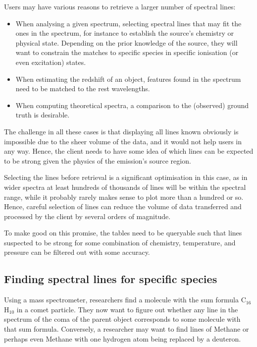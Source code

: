 \documentclass[11pt,a4paper]{ivoa}
\begin{document}
Users may have various reasons to retrieve a larger number of spectral
lines:

\begin{itemize}
\item When analysing a given spectrum, selecting spectral lines that may
fit the ones in the spectrum, for instance to establish the source's
chemistry or physical state.  Depending on the prior knowledge of the
source, they will want to constrain the matches to specific species in
specific ionisation (or even excitation) states.

\item When estimating the redshift of an object, features found in the
spectrum need to be matched to the rest wavelengths.

\item When computing theoretical spectra, a comparison to the (observed)
ground truth is desirable.
\end{itemize}

The challenge in all these cases is that displaying all lines
known obviously is impossible due to the sheer volume of the data,
and it would not help users in any way.
Hence, the client needs to have some idea of which lines can be expected
to be strong given the physics of the emission's source region.

Selecting the lines before retrieval is a significant optimisation in
this case, as in wider spectra at least hundreds of thousands of lines
will be within the spectral range, while it probably rarely makes sense
to plot more than a hundred or so.  Hence, careful selection of lines
can reduce the volume of data transferred and processed by the client by
several orders of magnitude.

To make good on this promise, the tables need to be queryable such that
lines suspected to be strong for some combination of chemistry,
temperature, and pressure can be filtered out with some accuracy.


\subsection{Finding spectral lines for specific species}

Using a mass spectrometer, researchers find a molecule with the
sum formula C$_{16}$H$_{10}$  in a comet particle.  They now want to
figure out whether any line in the spectrum of the coma of the parent
object corresponds to some molecule with that sum formula.
Conversely, a researcher may want to find lines of Methane or perhaps
even Methane with one hydrogen atom being replaced by a deuteron.
\end{document}
